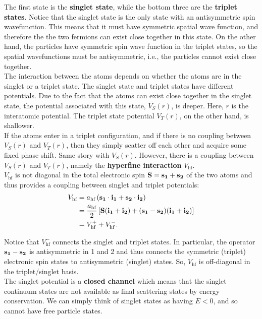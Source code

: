 \documentclass{book}
\theoremstyle{definition}
\newcommand{\f}[2]{\frac{#1}{#2}}
\newcommand{\lb}{\left[}
\newcommand{\rb}{\right]}
\begin{document}
The first state is the \textbf{singlet state}, while the bottom three are the \textbf{triplet states}. Notice that the singlet state is the only state with an antisymmetric spin wavefunction. This means that it must have symmetric spatial wave function, and therefore the the two fermions can exist close together in this state. On the other hand, the particles have symmetric spin wave function in the triplet states, so the spatial wavefunctions must be antisymmetric, i.e., the particles cannot exist close together.\\


The interaction between the atoms depends on whether the atoms are in the singlet or a triplet state. The singlet state and triplet states have different potentials. Due to the fact that the atoms can exist close together in the singlet state, the potential associated with this state, $V_S(r)$, is deeper. Here, $r$ is the interatomic potential. The triplet state potential $V_T(r)$, on the other hand, is shallower. \\

If the atoms enter in a triplet configuration, and if there is no coupling between $V_S(r)$ and $V_T(r)$, then they simply scatter off each other and acquire some fixed phase shift. Same story with $V_S(r)$. However, there is a coupling between $V_S(r)$ and $V_T(r)$, namely the \textbf{hyperfine interaction} $V_\text{hf}$. \\

$V_\text{hf}$ is not diagonal in the total electronic spin $\bf{S} = \bf{s}_1 + \bf{s}_2$ of the two atoms and thus provides a coupling between singlet and triplet potentials:
\begin{align*}
	V_\text{hf} &= a_\text{hf} \, (\bf{s}_1 \cdot \bf{i}_1 + \bf{s}_2 \cdot \bf{i}_2)\\
	&= \f{a_\text{hf}}{2} \lb \bf{S} {(\bf{i}_1 + \bf{i}_2)} +  (\bf{s}_1 - \bf{s}_2) {(\bf{i}_1 + \bf{i}_2)} \rb\\
	&= V_\text{hf}^+ + V_\text{hf}^-.
\end{align*}

Notice that $V_\text{hf}^-$ connects the singlet and triplet states. In particular, the operator $\bf{s}_1 - \bf{s}_2$ is antisymmetric in 1 and 2 and thus connects the symmetric (triplet) electronic spin states to antisymmetric (singlet) states. So, $V_\text{hf}$ is off-diagonal in the triplet/singlet basis. \\

The singlet potential is a \textbf{closed channel} which means that the singlet continuum states are not available as final scattering states by energy conservation. We can simply think of singlet states as having $E<0$, and so cannot have free particle states. 
\end{document}
